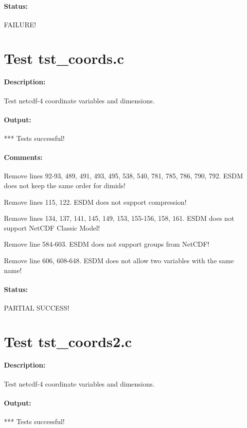 \paragraph{Status:} FAILURE!

\section{Test tst\_coords.c}

\paragraph{Description:} Test netcdf-4 coordinate variables and dimensions.

\paragraph{Output:} *** Tests successful!

\paragraph{Comments:} Remove lines 92-93, 489, 491, 493, 495, 538, 540, 781, 785, 786, 790, 792. ESDM does not keep the same order for dimids!

Remove lines 115, 122. ESDM does not support compression!

Remove lines 134, 137, 141, 145, 149, 153, 155-156, 158, 161. ESDM does not support NetCDF Classic Model!

Remove line 584-603. ESDM does not support groups from NetCDF!

Remove line 606, 608-648. ESDM does not allow two variables with the same name!

\paragraph{Status:} PARTIAL SUCCESS!

\section{Test tst\_coords2.c}

\paragraph{Description:} Test netcdf-4 coordinate variables and dimensions.

\paragraph{Output:} *** Tests successful!

